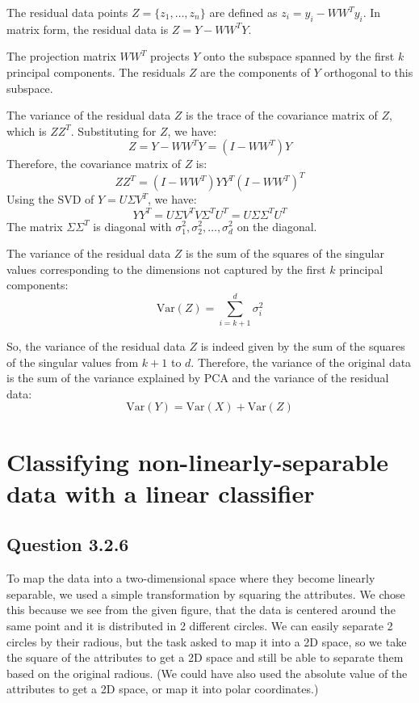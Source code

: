 \documentclass{article}
\begin{document}
The residual data points \( Z = \{z_1, \ldots, z_n\} \) are defined as \( z_i = y_i - W W^T y_i \). In matrix form, the residual data is \( Z = Y - W W^T Y \).

The projection matrix \( W W^T \) projects \( Y \) onto the subspace spanned by the first \( k \) principal components. The residuals \( Z \) are the components of \( Y \) orthogonal to this subspace.

The variance of the residual data \( Z \) is the trace of the covariance matrix of \( Z \), which is \( Z Z^T \). Substituting for \( Z \), we have:
\[
Z = Y - W W^T Y = (I - W W^T) Y
\]
Therefore, the covariance matrix of \( Z \) is:
\[
Z Z^T = (I - W W^T) Y Y^T (I - W W^T)^T
\]
Using the SVD of \( Y = U \Sigma V^T \), we have:
\[
Y Y^T = U \Sigma V^T V \Sigma^T U^T = U \Sigma \Sigma^T U^T
\]
The matrix \( \Sigma \Sigma^T \) is diagonal with \(\sigma_1^2, \sigma_2^2, \ldots, \sigma_d^2\) on the diagonal.

The variance of the residual data \( Z \) is the sum of the squares of the singular values corresponding to the dimensions not captured by the first \( k \) principal components:
\[
\text{Var}(Z) = \sum_{i=k+1}^{d} \sigma_i^2
\]

So, the variance of the residual data \( Z \) is indeed given by the sum of the squares of the singular values from \( k+1 \) to \( d \). Therefore, the variance of the original data is the sum of the variance explained by PCA and the variance of the residual data:
\[
\text{Var}(Y) = \text{Var}(X) + \text{Var}(Z)
\]

\section{Classifying non-linearly-separable data with a linear classifier}

\subsection{Question 3.2.6}

To map the data into a two-dimensional space where they become linearly separable, we used a simple transformation by squaring the attributes. We chose this because we see from the given figure, that the data is centered around the same point and it is distributed in 2 different circles. We can easily separate 2 circles by their radious, but the task asked to map it into a 2D space, so we take the square of the attributes to get a 2D space and still be able to separate them based on the original radious. (We could have also used the absolute value of the attributes to get a 2D space, or map it into polar coordinates.)
\end{document}
